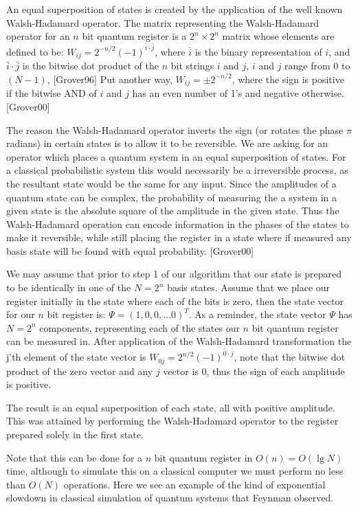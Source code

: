 \documentclass[]{article}
\begin{document}
An equal superposition of states is created by the application of the
well known Walsh-Hadamard operator.  The matrix representing the
Walsh-Hadamard operator for an $n$ bit quantum register is a $2^{n}
\times 2^{n}$ matrix whose elements are defined to be: $W_{ij} =
2^{-n/2}(-1)^{\bar{i} \cdot \bar{j}}$, where $\bar{i}$ is the binary
representation of $i$, and $\bar{i} \cdot \bar{j}$ is the bitwise dot
product of the $n$ bit strings $i$ and $j$, $i$ and $j$ range from 0
to $(N-1)$, [Grover96] Put another way, $W_{ij} = \pm 2^{-n/2}$, where
the sign is positive if the bitwise AND of $i$ and $j$ has an even
number of 1's and negative otherwise. [Grover00]

The reason the Walsh-Hadamard operator inverts the sign (or rotates
the phase $\pi$ radians) in certain states is to allow it to be
reversible.  We are asking for an operator which places a quantum
system in an equal superposition of states.  For a classical
probabilistic system this would necessarily be a irreversible process,
as the resultant state would be the same for any input.  Since the
amplitudes of a quantum state can be complex, the probability of
measuring the a system in a given state is the absolute square of the
amplitude in the given state.  Thus the Walsh-Hadamard operation can
encode information in the phases of the states to make it reversible,
while still placing the register in a state where if measured any
basis state will be found with equal probability. [Grover00]

We may assume that prior to step 1 of our algorithm that our state is
prepared to be identically in one of the $N = 2^{n}$ basis states.
Assume that we place our register initially in the state where each of
the bits is zero, then the state vector for our $n$ bit register is:
$\Psi = (1, 0, 0, \ldots 0)^{T}$.  As a reminder, the state vector
$\Psi$ has $N = 2^{n}$ components, representing each of the states our
$n$ bit quantum register can be measured in.  After application of the
Walsh-Hadamard transformation the j'th element of the state vector is
$W_{0j} = 2^{n/2}(-1)^{\bar{0} \cdot \bar{j}}$, note that the bitwise
dot product of the zero vector and any $j$ vector is 0, thus the sign
of each amplitude is positive.

The result is an equal superposition of each state, all with positive
amplitude.  This was attained by performing the Walsh-Hadamard
operator to the register prepared solely in the first state.

Note that this can be done for a $n$ bit quantum register in $O(n) =
O(\lg N)$ time, although to simulate this on a classical computer we
must perform no less than $O(N)$ operations.  Here we see an example
of the kind of exponential slowdown in classical simulation of quantum
systems that Feynman observed.
\end{document}
